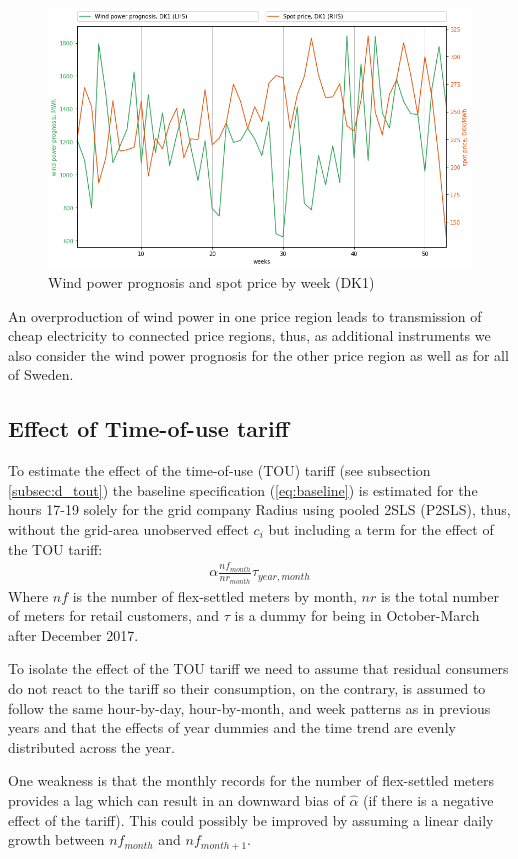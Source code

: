 \vspace{-1em}
\begin{figure}[H]
  \centering
  \caption{Wind power prognosis and spot price by week (DK1)}
  \label{fig:wp_price_dk1_week}
    \includegraphics[width=1 \textwidth]{03_figures/wp_DK1_weeks}
\end{figure}

An overproduction of wind power in one price region leads to transmission of cheap electricity to connected price regions, thus, as additional instruments we also consider the wind power prognosis for the other price region as well as for all of Sweden.

\subsection{Effect of Time-of-use tariff}
\label{subsec:e_tout}
To estimate the effect of the time-of-use (TOU) tariff (see subsection \ref{subsec:d_tout}) the baseline specification (\ref{eq:baseline}) is estimated for the hours 17-19 solely for the grid company Radius using pooled 2SLS (P2SLS), thus, without the grid-area unobserved effect $c_i$ but including a term for the effect of the TOU tariff:
\begin{align}
  \alpha\frac{nf_{month}}{nr_{month}}\tau_{year,month}
  \label{eq:tout}
\end{align}
Where $nf$ is the number of flex-settled meters by month, $nr$ is the total number of meters for retail customers, and $\tau$ is a dummy for being in October-March after December 2017.
\bigskip\par
To isolate the effect of the TOU tariff we need to assume that residual consumers do not react to the tariff so their consumption, on the contrary, is assumed to follow the same hour-by-day, hour-by-month, and week patterns as in previous years and that the effects of year dummies and the time trend are evenly distributed across the year.
\par
One weakness is that the monthly records for the number of flex-settled meters provides a lag which can result in an downward bias of $\widehat{\alpha}$ (if there is a negative effect of the tariff). This could possibly be improved by assuming a linear daily growth between $nf_{month}$ and $nf_{month+1}$.


